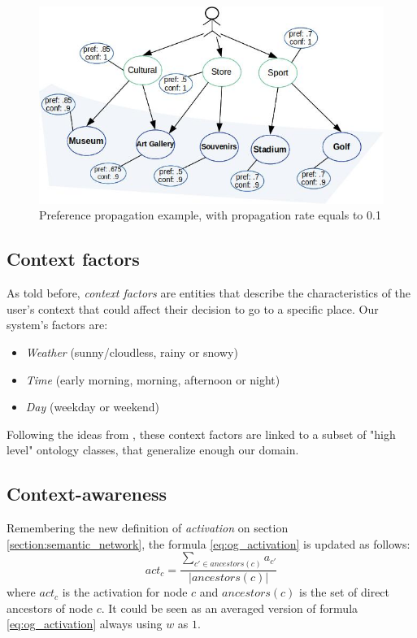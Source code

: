 \begin{figure}[h]
\centering
\includegraphics[scale=0.5]{draws/pref_spred.jpg}
\caption{Preference propagation example, with propagation rate equals to 0.1}
\label{fig:pref_prop}
\end{figure}

\subsection{Context factors} \label{section:context_factors}
As told before, \textit{context factors} are entities that describe the characteristics of the user's context that could affect their decision to go to a specific place. Our system's factors are: 
\begin{itemize}
    \item \textit{Weather} (sunny/cloudless, rainy or snowy)
    \item \textit{Time} (early morning, morning, afternoon or night)
    \item \textit{Day} (weekday or weekend)
\end{itemize}
Following the ideas from \cite{bahramian_abbaspour_claramunt_2017}, these context factors are linked to a subset of "high level" ontology classes, that generalize enough our domain. 

\subsection{Context-awareness} \label{section:context-awareness}
Remembering the new definition of \textit{activation} on section \ref{section:semantic_network}, the formula \ref{eq:og_activation} is updated as follows:
\begin{equation} \label{eq:activation}
    act_c = \frac{\displaystyle \sum_{c' \in ancestors(c)} a_{c'}}{|ancestors(c)|}
\end{equation}
where $act_c$ is the activation for node $c$ and $ancestors(c)$ is the set of direct ancestors of node $c$. It could be seen as an averaged version of formula \ref{eq:og_activation} always using $w$ as $1$.

